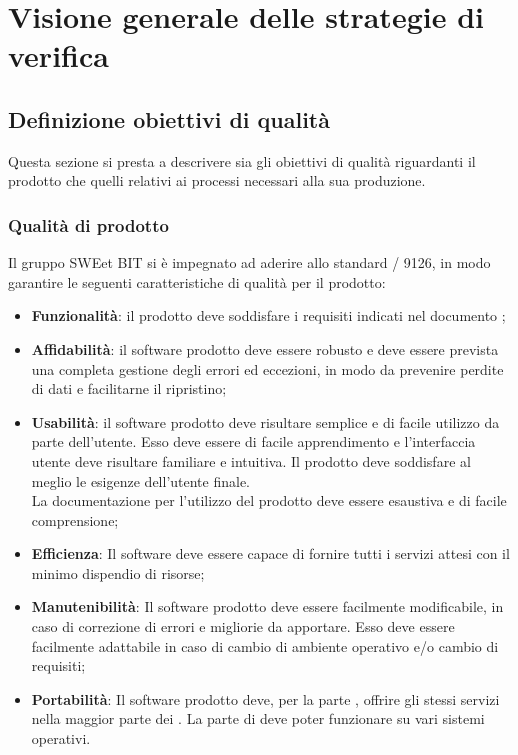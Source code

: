 \section{Visione generale delle strategie di verifica}
  \subsection{Definizione obiettivi di qualità}
  Questa sezione si presta a descrivere sia gli obiettivi di qualità riguardanti il prodotto
  che quelli relativi ai processi necessari alla sua produzione.
    \subsubsection{Qualità di prodotto}
    Il gruppo SWEet BIT si è impegnato ad aderire allo standard / 9126, in modo garantire
    le seguenti caratteristiche di qualità per il prodotto:
    \begin{itemize}
      \item \textbf{Funzionalità}: il prodotto deve soddisfare i requisiti indicati nel documento ;

      \item \textbf{Affidabilità}: il software prodotto deve essere robusto e deve essere prevista una completa gestione degli errori ed eccezioni,
       in modo da prevenire perdite di dati e facilitarne il ripristino;

      \item \textbf{Usabilità}: il software prodotto deve risultare semplice e di facile utilizzo da parte dell'utente.
      Esso deve essere di facile apprendimento e l'interfaccia utente deve risultare familiare e intuitiva. Il prodotto deve soddisfare al meglio le esigenze dell'utente finale. \\
      La documentazione per l'utilizzo del prodotto deve essere esaustiva e di facile comprensione;

      \item \textbf{Efficienza}: Il software deve essere capace di fornire tutti i servizi attesi con il minimo dispendio di risorse;

      \item \textbf{Manutenibilità}: Il software prodotto deve essere facilmente modificabile, in caso di correzione di errori e migliorie da apportare. Esso deve essere facilmente
      adattabile in caso di cambio di ambiente operativo e/o cambio di requisiti;

      \item \textbf{Portabilità}: Il software prodotto deve, per la parte , offrire gli stessi servizi nella maggior parte dei .
      La parte di  deve poter funzionare su vari sistemi operativi.
    \end{itemize}

